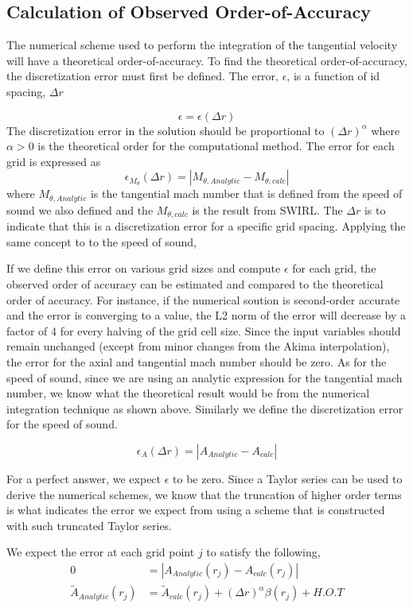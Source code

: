 \subsection{Calculation of Observed Order-of-Accuracy}
The numerical scheme used to perform the integration of the tangential velocity
will have a theoretical order-of-accuracy. To find the theoretical order-of-accuracy,
the discretization error must first be defined. The error, $\epsilon$, is a function of id spacing, $\Delta r$

\[ \epsilon = \epsilon(\Delta r) \]
The discretization error in the solution should be proportional to 
$\left( \Delta r \right)^{\alpha}$ where $\alpha > 0$ is the theoretical order
for the computational method.  The error for each grid is expressed as 
\[ \epsilon_{M_{\theta}}(\Delta r) = |M_{\theta,Analytic}-M_{\theta,calc}|\]
where $M_{\theta,Analytic}$ is the tangential mach number that is defined from the
speed of sound we also defined and the $M_{\theta,calc}$ is the result from 
SWIRL. The $\Delta r$ is to indicate that this is a discretization error for a
specific grid spacing. Applying the same concept to to the speed of sound,

If we define this error on various grid sizes and compute $\epsilon$ for
each grid, the observed order of accuracy can be estimated and compared to
the theoretical order of accuracy. For instance, if the numerical soution
is second-order accurate and the error is converging to a value, the L2 norm of
the error will decrease by a factor of 4 for every halving of the grid cell 
size. 
Since the input variables should remain unchanged (except from minor changes 
from the Akima interpolation), the error for the axial and tangential mach 
number should be zero. As for the speed of sound, since we are using an analytic
expression for the tangential mach number, we know what the theoretical result
would be from the numerical integration technique as shown above. 
Similarly we define the discretization error for the speed of sound.

\[ \epsilon_{A}(\Delta r) = |A_{Analytic}-A_{calc}|\]

For a perfect answer, we expect $\epsilon$ to be zero. Since a Taylor series can 
be used to derive the numerical schemes, we know that the truncation of higher
order terms is what indicates the error we expect from using a scheme that 
is constructed with such truncated Taylor series.

We expect the error at each grid point $j$ to satisfy the following,
\begin{align*}
    0 &= |A_{Analytic}(r_j) - A_{calc}(r_j)| \\
    \widetilde{A}_{Analytic}(r_j) &= \widetilde{A}_{calc}(r_j) +
    (\Delta r)^{\alpha} \beta(r_j)  + H.O.T
\end{align*}

